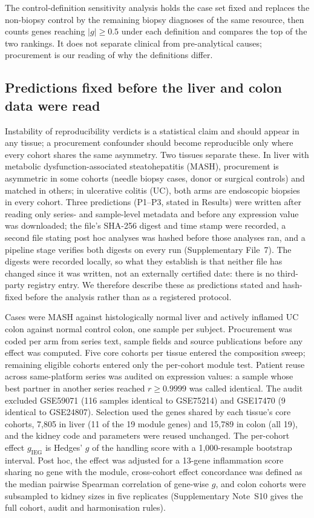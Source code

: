 \documentclass[unnumsec,webpdf,contemporary,large,numbered]{oup-authoring-template}
\begin{document}
The control-definition sensitivity analysis holds the case set fixed and replaces the non-biopsy
control by the remaining biopsy diagnoses of the same resource, then counts genes reaching
$|g| \ge 0.5$ under each definition and compares the top of the two rankings. It does not
separate clinical from pre-analytical causes; procurement is our reading of why the definitions
differ.

\subsection{Predictions fixed before the liver and colon data were read}\label{sec:xtmethods}

Instability of reproducibility verdicts is a statistical claim and should appear in any tissue; a
procurement confounder should become reproducible only where every cohort shares the same
asymmetry. Two tissues separate these. In liver with metabolic dysfunction-associated
steatohepatitis (MASH), procurement is asymmetric in some cohorts (needle biopsy cases, donor or
surgical controls) and matched in others; in ulcerative colitis (UC), both arms are endoscopic
biopsies in every cohort. Three predictions (P1--P3, stated in Results) were written after reading
only series- and sample-level metadata and before any expression value was downloaded; the file's
SHA-256 digest and time stamp were recorded, a second file stating post hoc analyses was hashed
before those analyses ran, and a pipeline stage verifies both digests on every run
(Supplementary File~7). The digests were recorded locally, so what they establish is that neither
file has changed since it was written, not an externally certified date: there is no third-party
registry entry. We therefore describe these as predictions stated and hash-fixed before the
analysis rather than as a registered protocol.

Cases were MASH against histologically normal liver and actively inflamed UC colon against
normal control colon, one sample per subject. Procurement was coded per arm from series text,
sample fields and source publications before any effect was computed. Five core cohorts per
tissue entered the composition sweep; remaining eligible cohorts entered only the per-cohort
module test. Patient reuse across same-platform series was audited on expression values: a sample
whose best partner in another series reached $r \ge 0.9999$ was called identical. The audit
excluded GSE59071 (116 samples identical to GSE75214) and GSE17470 (9 identical to GSE24807). Selection
used the genes shared by each tissue's core cohorts, 7,805 in liver (11 of the 19 module genes)
and 15,789 in colon (all 19), and the kidney code and parameters were reused unchanged. The
per-cohort effect $g_{\text{IEG}}$ is Hedges' $g$ of the handling score with a 1,000-resample
bootstrap interval. Post hoc, the effect was adjusted for a 13-gene inflammation score sharing no
gene with the module, cross-cohort effect concordance was defined as the median pairwise Spearman
correlation of gene-wise $g$, and colon cohorts were subsampled to kidney sizes in five
replicates (Supplementary Note~S10 gives the full cohort, audit and harmonisation rules).
\end{document}
